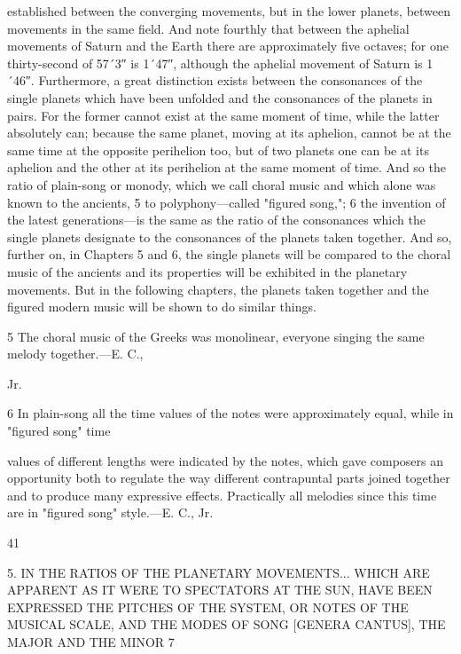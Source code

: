 \documentclass{article}
\begin{document}
established between the converging movements, but in the lower planets,
between movements in the same field. And note fourthly that between
the aphelial movements of Saturn and the Earth there are approximately
five octaves; for one thirty-second of 57´3″ is 1´47″, although the
aphelial movement of Saturn is 1´46″.
Furthermore, a great distinction exists between the consonances of the
single planets which have been unfolded and the consonances of the
planets in pairs. For the former cannot exist at the same moment of time,
while the latter absolutely can; because the same planet, moving at its
aphelion, cannot be at the same time at the opposite perihelion too, but
of two planets one can be at its aphelion and the other at its perihelion at
the same moment of time. And so the ratio of plain-song or monody,
which we call choral music and which alone was known to the ancients, 5
to polyphony—called "figured song,"; 6 the invention of the latest
generations—is the same as the ratio of the consonances which the single
planets designate to the consonances of the planets taken together. And
so, further on, in Chapters 5 and 6, the single planets will be compared to
the choral music of the ancients and its properties will be exhibited in
the planetary movements. But in the following chapters, the planets
taken together and the figured modern music will be shown to do similar
things.

5 The choral music of the Greeks was monolinear, everyone singing the same melody together.—E. C.,

Jr.

6 In plain-song all the time values of the notes were approximately equal, while in "figured song" time

values of different lengths were indicated by the notes, which gave composers an opportunity both to
regulate the way different contrapuntal parts joined together and to produce many expressive effects.
Practically all melodies since this time are in "figured song" style.—E. C., Jr.


41

5. IN THE RATIOS OF THE PLANETARY
MOVEMENTS...
WHICH ARE APPARENT AS IT WERE TO SPECTATORS AT THE SUN,
HAVE BEEN EXPRESSED THE PITCHES OF THE SYSTEM, OR
NOTES OF THE MUSICAL SCALE, AND THE MODES OF SONG
[GENERA CANTUS], THE MAJOR AND THE MINOR 7
\end{document}
